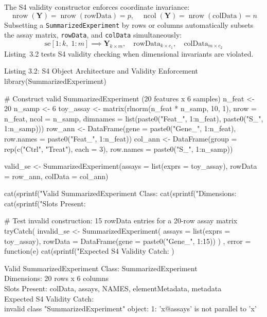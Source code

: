 \documentclass[11pt,twoside,openright]{book}
\begin{document}
The S4 validity constructor enforces coordinate invariance:
\begin{equation}
\operatorname{nrow}(\mathbf{Y}) = \operatorname{nrow}(\text{rowData}) = p, \quad \operatorname{ncol}(\mathbf{Y}) = \operatorname{nrow}(\text{colData}) = n
\label{eq:coordinate_invariance}
\end{equation}
Subsetting a \texttt{SummarizedExperiment} by rows or columns automatically subsets the assay matrix, \texttt{rowData}, and \texttt{colData} simultaneously:
\begin{equation}
\text{se}[1{:}k, \; 1{:}m] \implies \mathbf{Y}_{k \times m}, \quad \text{rowData}_{k \times c_1}, \quad \text{colData}_{m \times c_2}
\label{eq:se_subsetting}
\end{equation}
Listing~3.2 tests S4 validity checking when dimensional invariants are violated.

\begin{rchunk}{Listing 3.2: S4 Object Architecture and Validity Enforcement}
library(SummarizedExperiment)

# Construct valid SummarizedExperiment (20 features x 6 samples)
n_feat <- 20
n_samp <- 6
toy_assay <- matrix(rlnorm(n_feat * n_samp, 10, 1), nrow = n_feat, ncol = n_samp,
                    dimnames = list(paste0("Feat_", 1:n_feat), paste0("S_", 1:n_samp)))
row_ann <- DataFrame(gene = paste0("Gene_", 1:n_feat), row.names = paste0("Feat_", 1:n_feat))
col_ann <- DataFrame(group = rep(c("Ctrl", "Treat"), each = 3), row.names = paste0("S_", 1:n_samp))

valid_se <- SummarizedExperiment(assays = list(exprs = toy_assay),
                                 rowData = row_ann, colData = col_ann)

cat(sprintf("Valid SummarizedExperiment Class: %
cat(sprintf("Dimensions: %
cat(sprintf("Slots Present: %

# Test invalid construction: 15 rowData entries for a 20-row assay matrix
tryCatch({
  invalid_se <- SummarizedExperiment(
    assays  = list(exprs = toy_assay),
    rowData = DataFrame(gene = paste0("Gene_", 1:15))
  )
}, error = function(e) {
  cat(sprintf("Expected S4 Validity Catch:\n  %
})
\end{rchunk}

\begin{routput}
Valid SummarizedExperiment Class: SummarizedExperiment\\
Dimensions: 20 rows x 6 columns\\
Slots Present: colData, assays, NAMES, elementMetadata, metadata\\
Expected S4 Validity Catch:\\
\enspace\enspace invalid class "SummarizedExperiment" object: 1: 'x@assays' is not parallel to 'x'
\end{routput}
\end{document}
